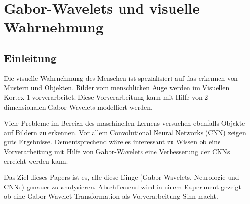 %
%
%
\chapter{Gabor-Wavelets und visuelle Wahrnehmung\label{chapter:visuell}}
\begin{refsection}

\section{Einleitung}

Die visuelle Wahrnehmung des Menschen ist spezialisiert auf das erkennen von Mustern und Objekten.
Bilder vom menschlichen Auge werden im Visuellen Kortex 1 vorverarbeitet.
Diese Vorverarbeitung kann mit Hilfe von 2-dimensionalen Gabor-Wavelets modelliert werden.

Viele Probleme im Bereich des maschinellen Lernens versuchen ebenfalls Objekte auf Bildern zu erkennen.
Vor allem Convolutional Neural Networks (CNN) zeigen gute Ergebnisse.
Dementsprechend wäre es interessant zu Wissen ob eine Vorverarbeitung mit Hilfe von Gabor-Wavelets eine Verbesserung der CNNs erreicht werden kann.

Das Ziel dieses Papers ist es, alle diese Dinge (Gabor-Wavelets, Neurologie und CNNs) genauer zu analysieren.
Abschliessend wird in einem Experiment gezeigt ob eine Gabor-Wavelet-Transformation als Vorverarbeitung Sinn macht.








\printbibliography[heading=subbibliography]
\end{refsection}
